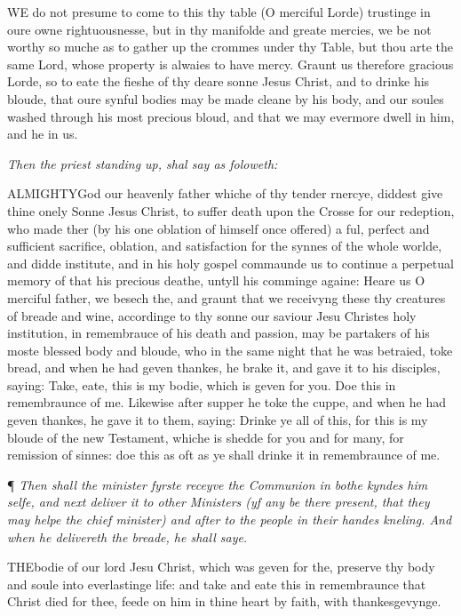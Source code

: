 WE
do not presume to come to this thy table (O merciful Lorde) trustinge
in oure owne rightuousnesse, but in thy manifolde and greate mercies,
we be not worthy so muche as to gather up the crommes under thy Table,
but thou arte the same Lord, whose property is alwaies to have mercy.
Graunt us therefore gracious Lorde, so to eate the fieshe of thy deare
sonne Jesus Christ, and to drinke his bloude, that oure synful bodies
may be made cleane by his body, and our soules washed through his most
precious bloud, and that we may evermore dwell in him, and he in us.

\emph{Then
the priest standing up, shal say as foloweth:}

\emph{}ALMIGHTY\textbf{}God our heavenly father whiche of thy tender rnercye, diddest give
thine onely Sonne Jesus Christ, to suffer death upon the Crosse for our
redeption, who made ther (by his one oblation of himself once offered)
a ful, perfect and sufficient sacrifice, oblation, and satisfaction for
the synnes of the whole worlde, and didde institute, and in his holy gospel
commaunde us to continue a perpetual memory of that his precious deathe,
untyll his comminge againe: Heare us O merciful father, we besech the,
and graunt that we receivyng these thy creatures of breade and wine, accordinge
to thy sonne our saviour Jesu Christes holy institution, in remembrauce
of his death and passion, may be partakers of his moste blessed body and
bloude, who in the same night that he was betraied, toke bread, and when
he had geven thankes, he brake it, and gave it to his disciples, saying:
Take, eate, this is my bodie, which is geven for you. Doe this in remembraunce
of me. Likewise after supper he toke the cuppe, and when he had geven
thankes, he gave it to them, saying: Drinke ye all of this, for this is
my bloude of the new Testament, whiche is shedde for you and for many,
for remission of sinnes: doe this as oft as ye shall drinke it in remembraunce
of me.

¶ \emph{Then
shall the minister fyrste receyve the Communion in bothe kyndes him selfe,
and next deliver it to other Ministers (yf any be there present, that
they may helpe the chief minister) and after to the people in their handes
kneling. And when he delivereth the breade, he shall saye.}

THE\textbf{}bodie of our lord Jesu Christ, which was geven for the, preserve thy
body and soule into everlastinge life: and take and eate this in remembraunce
that Christ died for thee, feede on him in thine heart by faith, with
thankesgevynge.

